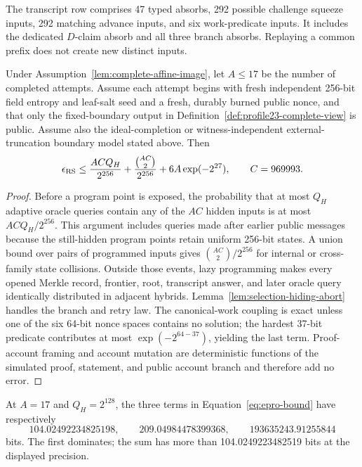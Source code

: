 The transcript row comprises 47 typed absorbs, 292 possible challenge
squeeze inputs, 292 matching advance inputs, and six work-predicate inputs.
It includes the dedicated \(D\)-claim absorb and all three branch absorbs.
Replaying a common prefix does not create new distinct inputs.

\begin{lemma}
\label{lem:epro-complete-view}
Under Assumption~\ref{lem:complete-affine-image}, let \(A\le17\) be the
number of completed attempts.  Assume each attempt begins with
fresh independent 256-bit field entropy and leaf-salt seed and a fresh,
durably burned public nonce, and that only the fixed-boundary output in
Definition~\ref{def:profile23-complete-view} is public.  Assume also the
ideal-completion or witness-independent external-truncation boundary model
stated above.  Then
\begin{equation}
 \epsilon_{\rm RS}
 \le
 \frac{ACQ_H}{2^{256}}
 +\frac{\binom{AC}{2}}{2^{256}}
 +6A\exp(-2^{27}),
 \qquad C=969993.
 \label{eq:epro-bound}
\end{equation}
\end{lemma}

\begin{proof}
Before a program point is exposed, the probability that at most \(Q_H\)
adaptive oracle queries contain any of the \(AC\) hidden inputs is at most
\(ACQ_H/2^{256}\).  This argument includes queries made after earlier public
messages because the still-hidden program points retain uniform 256-bit
states.  A union bound over pairs of programmed inputs gives
\(\binom{AC}{2}/2^{256}\) for internal or cross-family state collisions.
Outside those events, lazy programming makes every opened Merkle record,
frontier, root, transcript answer, and later oracle query identically
distributed in adjacent hybrids.  Lemma~\ref{lem:selection-hiding-abort}
handles the branch and retry law.  The canonical-work coupling is exact
unless one of the six 64-bit nonce spaces contains no solution; the hardest
37-bit predicate contributes at most \(\exp(-2^{64-37})\), yielding the last
term.  Proof-account framing and account mutation are deterministic functions
of the simulated proof, statement, and public account branch and therefore
add no error.
\end{proof}

At \(A=17\) and \(Q_H=2^{128}\), the three terms in
Equation~\eqref{eq:epro-bound} have respectively
\[
 104.02492234825198,\qquad
 209.04984478399368,\qquad
 193635243.91255844
\]
bits.  The first dominates; the sum has more than
104.0249223482519 bits at the displayed precision.

